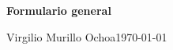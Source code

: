 \begin{center}

	\huge\textbf{
		Formulario general
	}\linebreak[4]

	Virgilio Murillo Ochoa\linebreak[4]
	\today\linebreak[4]

\end{center}


